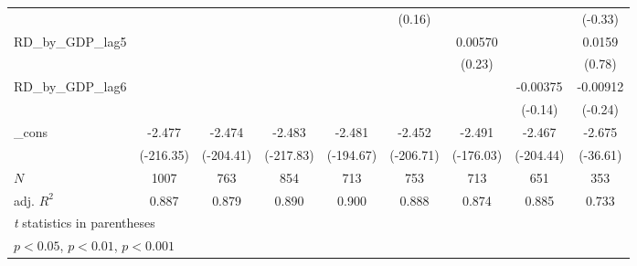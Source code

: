 {\begin{tabular}{l*{8}{c}}
          &                  &                  &                  &                  &   (0.16)         &                  &                  &  (-0.33)         \\
\addlinespace
RD\_by\_GDP\_lag5&                  &                  &                  &                  &                  &  0.00570         &                  &   0.0159         \\
          &                  &                  &                  &                  &                  &   (0.23)         &                  &   (0.78)         \\
\addlinespace
RD\_by\_GDP\_lag6&                  &                  &                  &                  &                  &                  & -0.00375         & -0.00912         \\
          &                  &                  &                  &                  &                  &                  &  (-0.14)         &  (-0.24)         \\
\addlinespace
\_cons    &   -2.477\sym{***}&   -2.474\sym{***}&   -2.483\sym{***}&   -2.481\sym{***}&   -2.452\sym{***}&   -2.491\sym{***}&   -2.467\sym{***}&   -2.675\sym{***}\\
          &(-216.35)         &(-204.41)         &(-217.83)         &(-194.67)         &(-206.71)         &(-176.03)         &(-204.44)         & (-36.61)         \\
\midrule
\(N\)     &     1007         &      763         &      854         &      713         &      753         &      713         &      651         &      353         \\
adj. \(R^{2}\)&    0.887         &    0.879         &    0.890         &    0.900         &    0.888         &    0.874         &    0.885         &    0.733         \\
\bottomrule
\multicolumn{9}{l}{\footnotesize \textit{t} statistics in parentheses}\\
\multicolumn{9}{l}{\footnotesize \sym{*} \(p<0.05\), \sym{**} \(p<0.01\), \sym{***} \(p<0.001\)}\\
\end{tabular}
}
